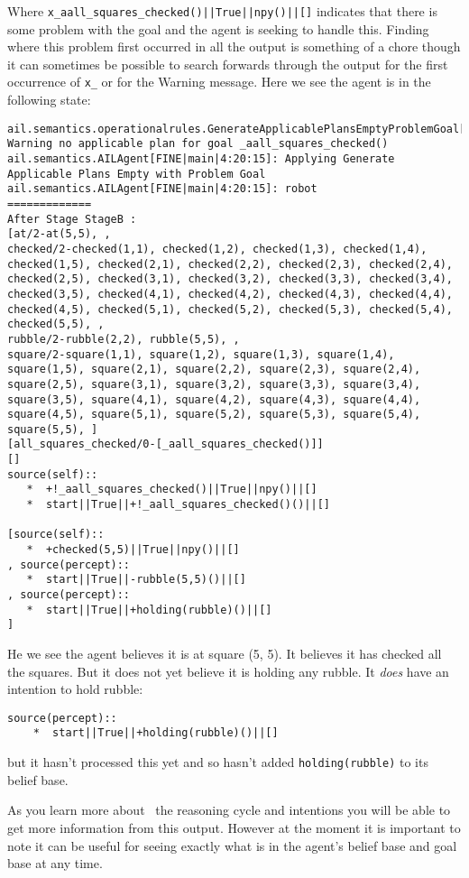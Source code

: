 \documentclass[a4]{article}
\begin{document}
Where \texttt{x\!\_aall\_squares\_checked()||True||npy()||[]} indicates that there is some problem with the goal and the agent is seeking to handle this.  Finding where this problem first occurred in all the output is something of a chore though it can sometimes be possible to search forwards through the output for the first occurrence of \texttt{x\!\_}  or for the Warning message.  Here we see the agent is in the following state:

\begin{verbatim}
ail.semantics.operationalrules.GenerateApplicablePlansEmptyProblemGoal[WARNING|main|4:20:15]: Warning no applicable plan for goal _aall_squares_checked() 
ail.semantics.AILAgent[FINE|main|4:20:15]: Applying Generate Applicable Plans Empty with Problem Goal 
ail.semantics.AILAgent[FINE|main|4:20:15]: robot
=============
After Stage StageB :
[at/2-at(5,5), , 
checked/2-checked(1,1), checked(1,2), checked(1,3), checked(1,4), checked(1,5), checked(2,1), checked(2,2), checked(2,3), checked(2,4), checked(2,5), checked(3,1), checked(3,2), checked(3,3), checked(3,4), checked(3,5), checked(4,1), checked(4,2), checked(4,3), checked(4,4), checked(4,5), checked(5,1), checked(5,2), checked(5,3), checked(5,4), checked(5,5), , 
rubble/2-rubble(2,2), rubble(5,5), , 
square/2-square(1,1), square(1,2), square(1,3), square(1,4), square(1,5), square(2,1), square(2,2), square(2,3), square(2,4), square(2,5), square(3,1), square(3,2), square(3,3), square(3,4), square(3,5), square(4,1), square(4,2), square(4,3), square(4,4), square(4,5), square(5,1), square(5,2), square(5,3), square(5,4), square(5,5), ]
[all_squares_checked/0-[_aall_squares_checked()]]
[]
source(self):: 
   *  +!_aall_squares_checked()||True||npy()||[]
   *  start||True||+!_aall_squares_checked()()||[]

[source(self):: 
   *  +checked(5,5)||True||npy()||[]
, source(percept):: 
   *  start||True||-rubble(5,5)()||[]
, source(percept):: 
   *  start||True||+holding(rubble)()||[]
] 
\end{verbatim}
He we see the agent believes it is at square (5, 5).  It believes it has checked all the squares.  But it does not yet believe it is holding any rubble.  It \emph{does} have an intention to hold rubble:
\begin{verbatim}
source(percept):: 
    *  start||True||+holding(rubble)()||[]
\end{verbatim}
but it hasn't processed this yet and so hasn't added \texttt{holding(rubble)} to its belief base.

As you learn more about \gwendolen\ the reasoning cycle and intentions you will be able to get more information from this output.  However at the moment it is important to note it can be useful for seeing exactly what is in the agent's belief base and goal base at any time.
\end{document}
